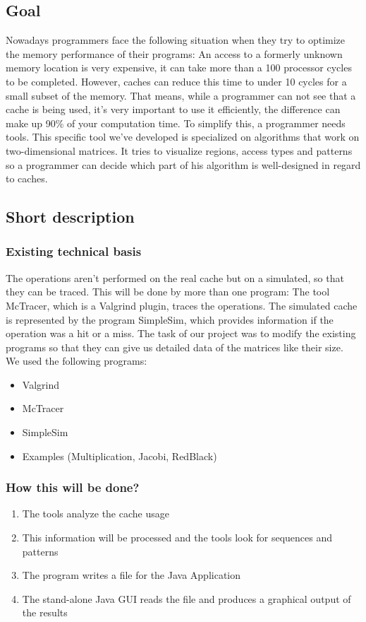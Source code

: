 \subsection{Goal}
Nowadays programmers face the following situation when they try to optimize the memory performance of their programs: An access to a formerly unknown memory location is very expensive, it can take more than a 100 processor cycles to be completed. However, caches can reduce this time to under 10 cycles for a small subset of the memory. That means, while a programmer can not see that a cache is being used, it's very important to use it efficiently, the difference can make up 90\% of your computation time.\newline
To simplify this, a programmer needs tools. This specific tool we've developed is specialized on algorithms that work on two-dimensional matrices. It tries to visualize regions, access types and patterns so a programmer can decide which part of his algorithm is well-designed in regard to caches.

\subsection{Short description}
\subsubsection{Existing technical basis}
The operations aren't performed on the real cache but on a simulated, so that they can be traced. This will be done by more than one program: The tool McTracer, which is a Valgrind plugin, traces the operations. The simulated cache is represented by the program SimpleSim, which provides information if the operation was a hit or a miss. The task of our project was to modify the existing programs so that they can give us detailed data of the matrices like their size.
\\

We used the following programs:
\begin{itemize}
\item Valgrind
\item McTracer
\item SimpleSim
\item Examples (Multiplication, Jacobi, RedBlack)
\end{itemize}

\subsubsection{How this will be done?}
\begin{enumerate}
\item The tools analyze the cache usage
\item This information will be processed and the tools look for sequences and patterns
\item The program writes a file for the Java Application
\item The stand-alone Java GUI reads the file and produces a graphical output of the results
\end{enumerate}

